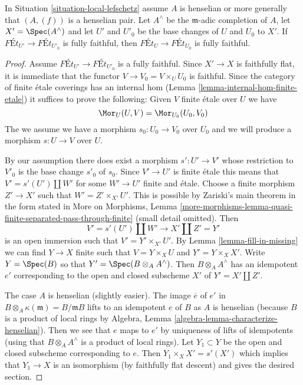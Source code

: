 \begin{lemma}
\label{lemma-fully-faithful-henselian-completion}
In Situation \ref{situation-local-lefschetz} assume $A$ is henselian
or more generally that $(A, (f))$ is a henselian pair.
Let $A^\wedge$ be the $\mathfrak m$-adic completion of $A$,
let $X' = \Spec(A^\wedge)$ and let $U'$ and $U'_0$ be the base changes of
$U$ and $U_0$ to $X'$. If $\textit{F\'Et}_{U'} \to \textit{F\'Et}_{U'_0}$
is fully faithful, then $\textit{F\'Et}_U \to \textit{F\'Et}_{U_0}$
is fully faithful.
\end{lemma}

\begin{proof}
Assume $\textit{F\'Et}_{U'} \longrightarrow \textit{F\'Et}_{U'_0}$
is a fully faithful. Since $X' \to X$ is faithfully flat, it is
immediate that the functor $V \to V_0 = V \times_U U_0$ is faithful.
Since the category of finite \'etale coverings has an internal hom
(Lemma \ref{lemma-internal-hom-finite-etale})
it suffices to prove the following: Given $V$ finite \'etale over $U$
we have
$$
\Mor_U(U, V) = \Mor_{U_0}(U_0, V_0)
$$
The we assume we have a morphism $s_0 : U_0 \to V_0$ over $U_0$ and we will
produce a morphism $s : U \to V$ over $U$.

\medskip\noindent
By our assumption there does exist a morphism $s' : U' \to V'$
whose restriction to $V'_0$ is the base change $s'_0$ of $s_0$.
Since $V' \to U'$ is finite \'etale this means that $V' = s'(U') \amalg W'$
for some $W' \to U'$ finite and \'etale.
Choose a finite morphism $Z' \to X'$ such that $W' = Z' \times_{X'} U'$.
This is possible by Zariski's main theorem in the form stated in
More on Morphisms, Lemma
\ref{more-morphisms-lemma-quasi-finite-separated-pass-through-finite}
(small detail omitted).
Then
$$
V' = s'(U') \amalg W' \longrightarrow X' \amalg Z' = Y'
$$
is an open immersion such that $V' = Y' \times_{X'} U'$.
By Lemma \ref{lemma-fill-in-missing} we can find $Y \to X$ finite
such that $V = Y \times_X U$ and $Y' = Y \times_X X'$.
Write $Y = \Spec(B)$ so that $Y' = \Spec(B \otimes_A A^\wedge)$.
Then $B \otimes_A A^\wedge$ has an idempotent $e'$
corresponding to the open and closed subscheme $X'$ of $Y' = X' \amalg Z'$.

\medskip\noindent
The case $A$ is henselian (slightly easier). The image $\overline{e}$
of $e'$ in $B \otimes_A \kappa(\mathfrak m) = B/\mathfrak mB$ lifts to an
idempotent $e$ of $B$ as $A$ is henselian (because $B$ is a product of
local rings by Algebra, Lemma \ref{algebra-lemma-characterize-henselian}).
Then we see that $e$ maps to $e'$ by uniqueness of lifts of idempotents
(using that $B \otimes_A A^\wedge$ is a product of local rings).
Let $Y_1 \subset Y$ be the open and closed subscheme corresponding to $e$.
Then $Y_1 \times_X X' = s'(X')$ which implies that $Y_1 \to X$ is
an isomorphism (by faithfully flat descent) and gives the desired section.


\end{proof}
